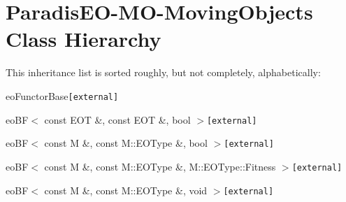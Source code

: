 \section{Paradis\-EO-MO-Moving\-Objects Class Hierarchy}
This inheritance list is sorted roughly, but not completely, alphabetically:\begin{CompactList}
\item eo\-Functor\-Base{\tt  [external]}\begin{CompactList}
\item eo\-BF$<$ const EOT \&, const EOT \&, bool $>${\tt  [external]}\begin{CompactList}
\item {}
\begin{CompactList}
\item {}
\end{CompactList}
\end{CompactList}
\item eo\-BF$<$ const M \&, const M::EOType \&, bool $>${\tt  [external]}\begin{CompactList}
\item {}
\begin{CompactList}
\item {}
\item {}
\end{CompactList}
\end{CompactList}
\item eo\-BF$<$ const M \&, const M::EOType \&, M::EOType::Fitness $>${\tt  [external]}\begin{CompactList}
\item {}
\end{CompactList}
\item eo\-BF$<$ const M \&, const M::EOType \&, void $>${\tt  [external]}\begin{CompactList}
\item {}
\end{CompactList}

\end{CompactList}
\end{CompactList}
